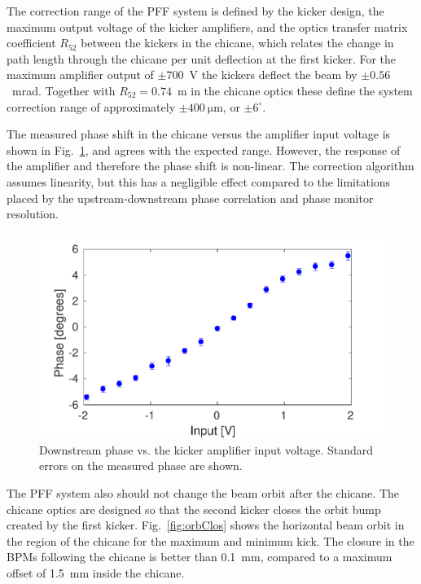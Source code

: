 \documentclass[%
 reprint,
superscriptaddress,
 amsmath,amssymb,
 prl,
]{revtex4-1}
\begin{document}
The correction range of the PFF system is defined by the kicker design, the 
maximum output voltage of the kicker amplifiers, and the optics transfer matrix 
coefficient \(R_{52}\) between the kickers in the chicane, which relates the 
change in path length through the chicane per unit 
deflection at the first kicker. 
For the maximum amplifier output of \(\pm700\)~V the kickers deflect the beam 
by \(\pm0.56\)~mrad. Together with \(R_{52} = 0.74\)~m in the chicane optics 
these define the system correction range of approximately 
\(\pm400~\mathrm{\mu m}\), or \(\pm6^\circ\).

The measured phase shift in the chicane versus the amplifier input voltage is 
shown in Fig.~\ref{fig:corrRange}, and agrees with the expected range. 
However, the response of the amplifier and therefore the phase shift is 
non-linear. The correction algorithm assumes linearity, but this has a 
negligible effect compared to the limitations placed by the
upstream-downstream phase correlation and phase monitor resolution.


\begin{figure}
	\includegraphics[width=\columnwidth]{figs/corrRange}
	\caption{\label{fig:corrRange}Downstream phase vs. the kicker amplifier 
	input voltage. Standard errors on the measured phase are shown.}
\end{figure}

The PFF system also should not change the beam orbit after the chicane. The 
chicane optics are designed so that the second kicker closes the orbit bump 
created by the first kicker.
Fig.~\ref{fig:orbClos} shows the horizontal beam orbit in the region 
of the chicane for the maximum and minimum kick. The closure in 
the BPMs following the chicane is better than 0.1~mm, compared to a maximum 
offset of 1.5~mm inside the chicane.
\end{document}
